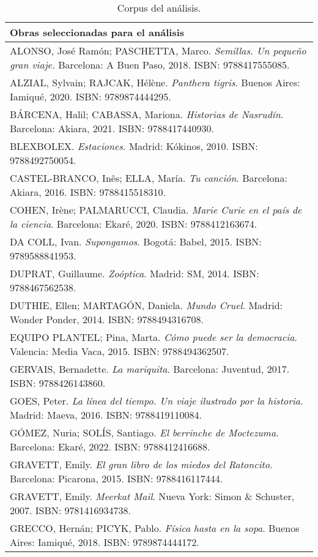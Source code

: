 \documentclass[spanish]{textolivre}
\begin{document}
\begin{table}[h!]
\centering \small
\begin{threeparttable}
\caption{Corpus del análisis.}
\label{tab01}
\begin{tabular}{p{}}
\toprule
\textbf{Obras seleccionadas para el análisis} \\
 \midrule
ALONSO, José Ramón; PASCHETTA, Marco. \textit{Semillas. Un pequeño gran viaje.} Barcelona: A Buen Paso, 2018. ISBN: 9788417555085. \\
ALZIAL, Sylvain; RAJCAK, Hélène. \textit{Panthera tigris}. Buenos Aires: Iamiqué, 2020. ISBN: 9789874444295. \\
BÁRCENA, Halil; CABASSA, Mariona. \textit{Historias de Nasrudín}. Barcelona: Akiara, 2021. ISBN: 9788417440930. \\
BLEXBOLEX. \textit{Estaciones}. Madrid: Kókinos, 2010. ISBN: 9788492750054. \\
CASTEL-BRANCO, Inês; ELLA, María. \textit{Tu canción}. Barcelona: Akiara, 2016. ISBN: 9788415518310. \\
COHEN, Irène; PALMARUCCI, Claudia. \textit{Marie Curie en el país de la ciencia}. Barcelona: Ekaré, 2020. ISBN: 9788412163674. \\
DA COLL, Ivan. \textit{Supongamos}. Bogotá: Babel, 2015. ISBN: 9789588841953. \\
DUPRAT, Guillaume. \textit{Zoóptica}. Madrid: SM, 2014. ISBN: 9788467562538. \\
DUTHIE, Ellen; MARTAGÓN, Daniela. \textit{Mundo Cruel}. Madrid: Wonder Ponder, 2014. ISBN: 9788494316708. \\
EQUIPO PLANTEL; Pina, Marta. \textit{Cómo puede ser la democracia}. Valencia: Media Vaca, 2015. ISBN: 9788494362507. \\
GERVAIS, Bernadette. \textit{La mariquita}. Barcelona: Juventud, 2017. ISBN: 9788426143860. \\
GOES, Peter. \textit{La línea del tiempo. Un viaje ilustrado por la historia}. Madrid: Maeva, 2016. ISBN: 9788419110084. \\
GÓMEZ, Nuria; SOLÍS, Santiago. \textit{El berrinche de Moctezuma}. Barcelona: Ekaré, 2022. ISBN: 9788412416688. \\
GRAVETT, Emily. \textit{El gran libro de los miedos del Ratoncito}. Barcelona: Picarona, 2015. ISBN: 9788416117444. \\
GRAVETT, Emily.\textit{ Meerkat Mail}. Nueva York: Simon \& Schuster, 2007. ISBN: 9781416934738. \\
GRECCO, Hernán; PICYK, Pablo. \textit{Física hasta en la sopa}. Buenos Aires: Iamiqué, 2018. ISBN: 9789874444172. \\

\end{tabular}
\end{threeparttable}
\end{table}
\end{document}
